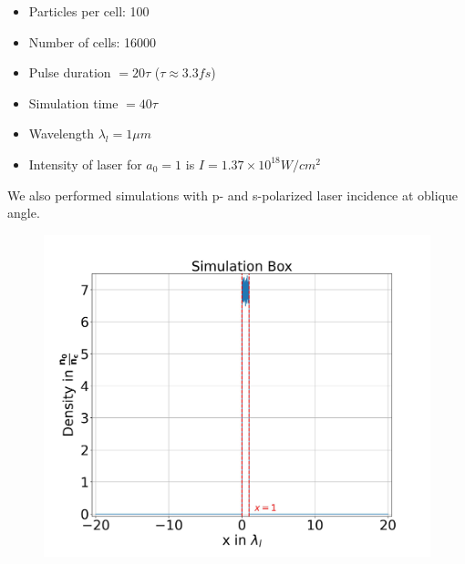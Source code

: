 \documentclass{beamer}
\begin{document}
\begin{frame}
    \begin{minipage}[t]{0.48\linewidth}
        \begin{itemize}
            \item Particles per cell: 100
            \item Number of cells: 16000
            \item Pulse duration $= 20 \tau$ ($\tau\approx 3.3 fs$)
            \item Simulation time $= 40 \tau$
            \item Wavelength $\lambda_l = 1 \mu m$
            \item Intensity of laser for $a_0 = 1$ is $I = 1.37 \times 10^{18} W/cm^2$
        \end{itemize}
        We also performed simulations with p- and s-polarized laser incidence at oblique angle.
    \end{minipage}
    \begin{minipage}[t]{0.48\linewidth}
        \begin{figure}
            \centering
            \includegraphics[width=1.0\textwidth, height=0.62\textheight]{images/plasma.jpg}
            \label{fig:plasma}
        \end{figure}
    \end{minipage}
\end{frame}
\end{document}

